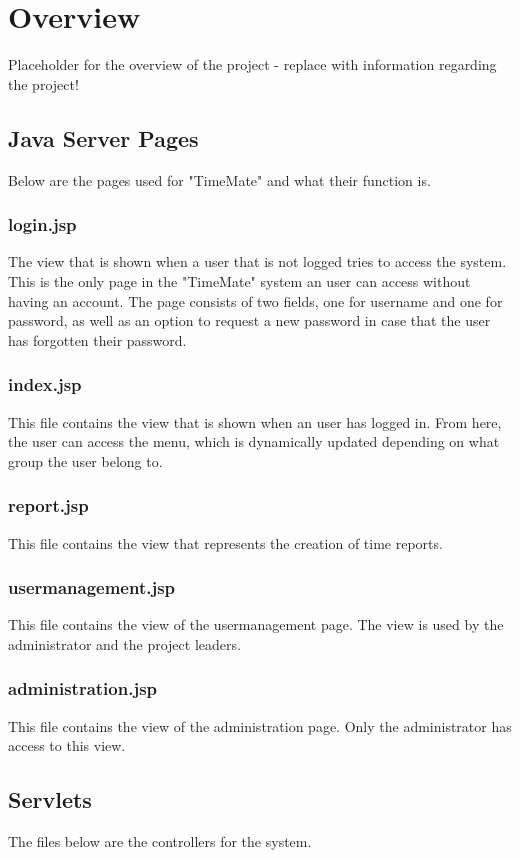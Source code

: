 \documentclass{article}
\begin{document}
\section{Overview}
Placeholder for the overview of the project - replace with information regarding the project!

\subsection{Java Server Pages}
Below are the pages used for "TimeMate" and what their function is.

\subsubsection{login.jsp}
The view that is shown when a user that is not logged tries to access the system. This is the only page in the "TimeMate" system an user can access without having an account. The page consists of two fields, one for username and one for password, as well as an option to request a new password in case that the user has forgotten their password.

\subsubsection{index.jsp}
This file contains the view that is shown when an user has logged in. From here, the user can access the menu, which is dynamically updated depending on what group the user belong to.

\subsubsection{report.jsp}
This file contains the view that represents the creation of time reports.

\subsubsection{usermanagement.jsp}
This file contains the view of the usermanagement page. The view is used by the administrator and the project leaders.

\subsubsection{administration.jsp}
This file contains the view of the administration page. Only the administrator has access to this view.

\subsection{Servlets}
The files below are the controllers for the system.
\end{document}
